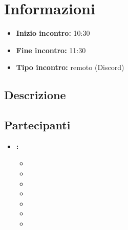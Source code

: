 \section{Informazioni}
\begin{itemize}
	\item \textbf{Inizio incontro:} 10:30
	\item \textbf{Fine incontro:} 11:30
	\item \textbf{Tipo incontro:} remoto (Discord)
\end{itemize}

\subsection{Descrizione}
\DocDescription

\subsection{Partecipanti}

\begin{itemize}
	\item \textbf{\GroupName:}
	\begin{itemize}
		\item \tommaso
		\item \marco
		\item \raul
		\item \sebastiano
		\item \martina
		\item \riccardo
		\item \mattia
	\end{itemize}
\end{itemize}

\clearpage
